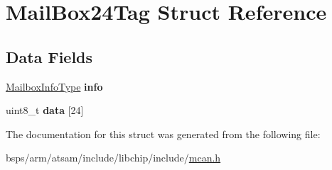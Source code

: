 \hypertarget{structMailBox24Tag}{}\section{Mail\+Box24\+Tag Struct Reference}
\label{structMailBox24Tag}
\subsection*{Data Fields}
\begin{DoxyCompactItemize}
\item 
\mbox{\label{structMailBox24Tag_abe877d14784ec00c7c5911d089f7afb6}} 
\mbox{\hyperlink{structMailboxInfoTag}{Mailbox\+Info\+Type}} {\bfseries info}
\item 
\mbox{\label{structMailBox24Tag_a33e1c120bb420f6aaa6a28448076c864}} 
uint8\+\_\+t {\bfseries data} \mbox{[}24\mbox{]}
\end{DoxyCompactItemize}


The documentation for this struct was generated from the following file\+:\begin{DoxyCompactItemize}
\item 
bsps/arm/atsam/include/libchip/include/\mbox{\hyperlink{mcan_8h}{mcan.\+h}}\end{DoxyCompactItemize}
